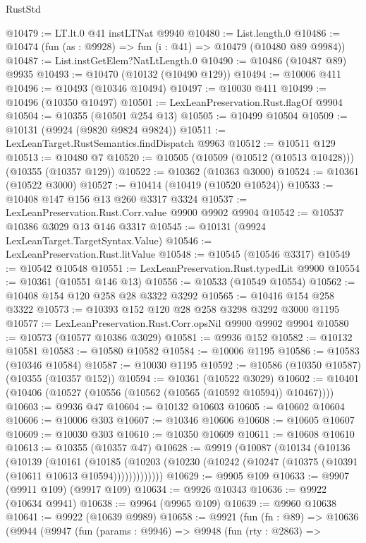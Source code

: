\begin{lexlean}{RustStd}
\begin{coremodule}
@10479 := LT.lt.{0} @41 instLTNat @9940
@10480 := List.length.{0}
@10486 := @10474 (fun (as : @9928) => fun (i : @41) => @10479 (@10480 @89 @9984))
@10487 := List.instGetElem?NatLtLength.{0}
@10490 := @10486 (@10487 @89) @9935
@10493 := @10470 (@10132 (@10490 @129))
@10494 := @10006 @411
@10496 := @10493 (@10346 @10494)
@10497 := @10030 @411
@10499 := @10496 (@10350 @10497)
@10501 := LexLeanPreservation.Rust.flagOf @9904
@10504 := @10355 (@10501 @254 @13)
@10505 := @10499 @10504
@10509 := @10131 (@9924 (@9820 @9824 @9824))
@10511 := LexLeanTarget.RustSemantics.findDispatch @9963
@10512 := @10511 @129
@10513 := @10480 @7
@10520 := @10505 (@10509 (@10512 (@10513 @10428))) (@10355 (@10357 @129))
@10522 := @10362 (@10363 @3000)
@10524 := @10361 (@10522 @3000)
@10527 := @10414 (@10419 (@10520 @10524))
@10533 := @10408 @147 @156 @13 @260 @3317 @3324
@10537 := LexLeanPreservation.Rust.Corr.value @9900 @9902 @9904
@10542 := @10537 @10386 @3029 @13 @146 @3317
@10545 := @10131 (@9924 LexLeanTarget.TargetSyntax.Value)
@10546 := LexLeanPreservation.Rust.litValue
@10548 := @10545 (@10546 @3317)
@10549 := @10542 @10548
@10551 := LexLeanPreservation.Rust.typedLit @9900
@10554 := @10361 (@10551 @146 @13)
@10556 := @10533 (@10549 @10554)
@10562 := @10408 @154 @120 @258 @28 @3322 @3292
@10565 := @10416 @154 @258 @3322
@10573 := @10393 @152 @120 @28 @258 @3298 @3292 @3000 @1195
@10577 := LexLeanPreservation.Rust.Corr.opsNil @9900 @9902 @9904
@10580 := @10573 (@10577 @10386 @3029)
@10581 := @9936 @152
@10582 := @10132 @10581
@10583 := @10580 @10582
@10584 := @10006 @1195
@10586 := @10583 (@10346 @10584)
@10587 := @10030 @1195
@10592 := @10586 (@10350 @10587) (@10355 (@10357 @152))
@10594 := @10361 (@10522 @3029)
@10602 := @10401 (@10406 (@10527 (@10556 (@10562 (@10565 (@10592 @10594)) @10467))))
@10603 := @9936 @47
@10604 := @10132 @10603
@10605 := @10602 @10604
@10606 := @10006 @303
@10607 := @10346 @10606
@10608 := @10605 @10607
@10609 := @10030 @303
@10610 := @10350 @10609
@10611 := @10608 @10610
@10613 := @10355 (@10357 @47)
@10628 := @9919
    (@10087
      (@10134
        (@10136
          (@10139
            (@10161
              (@10185
                (@10203 (@10230 (@10242 (@10247 (@10375 (@10391 (@10611 @10613 @10594)))))))))))))
@10629 := @9905 @109
@10633 := @9907 (@9911 @109) (@9917 @109)
@10634 := @9926 @10343
@10636 := @9922 (@10634 @9941)
@10638 := @9964 (@9965 @109)
@10639 := @9960 @10638
@10641 := @9922 (@10639 @9989)
@10658 := @9921
    (fun (fn : @89) =>
    @10636
      (@9944
        (@9947
          (fun (params : @9946) =>
          @9948
            (fun (rty : @2863) =>

\end{coremodule}
\end{lexlean}
